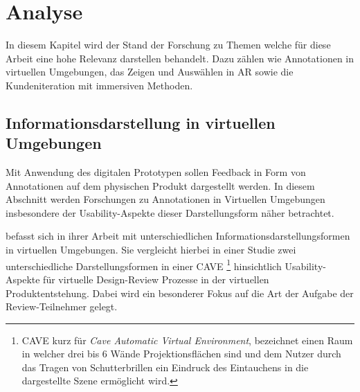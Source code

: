 \chapter{Analyse} \label{anlayse_capter}

In diesem Kapitel wird der Stand der Forschung zu Themen welche für diese Arbeit eine hohe Relevanz darstellen behandelt. Dazu zählen wie Annotationen in virtuellen Umgebungen, das Zeigen und Auswählen in AR sowie die Kundeniteration mit immersiven Methoden.

\section{Informationsdarstellung in virtuellen Umgebungen}\label{brand_abschnitt}

Mit Anwendung des digitalen Prototypen sollen Feedback in Form von Annotationen auf dem physischen Produkt dargestellt werden. 
In diesem Abschnitt werden Forschungen zu Annotationen in Virtuellen Umgebungen insbesondere der Usability-Aspekte dieser Darstellungsform näher betrachtet. 

\citeauthor{Brandenburg2019} befasst sich in ihrer Arbeit mit unterschiedlichen Informationsdarstellungsformen in virtuellen Umgebungen.
Sie vergleicht hierbei in einer Studie zwei unterschiedliche Darstellungsformen in einer CAVE \footnote{CAVE kurz für \textit{Cave Automatic Virtual Environment}, bezeichnet einen Raum in welcher drei bis 6 Wände Projektionsflächen sind und dem Nutzer durch das Tragen von Schutterbrillen ein Eindruck des Eintauchens in die dargestellte Szene ermöglicht wird. } hinsichtlich Usability-Aspekte für virtuelle Design-Review Prozesse in der virtuellen Produktentstehung. Dabei wird ein besonderer Fokus auf die Art der Aufgabe der Review-Teilnehmer gelegt.
\cite[S.~48]{Brandenburg2019}

